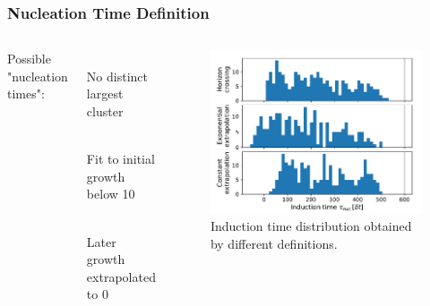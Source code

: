 \documentclass[smaller,notes=hide]{beamer}
\newlength{\wideitemsep}
\let\olditem\item
\renewcommand{\item}{\setlength{\itemsep}{\wideitemsep}\olditem}
\begin{document}
\begin{frame}
\frametitle{Nucleation Time Definition}
\begin{columns}
Possible "nucleation times": \vspace{0.25cm}\\

\begin{description}
\item[Horizon crossing:]{\hfill \\ \hspace{-1.5cm} No distinct largest cluster}

\item[Exponential extrapolation:]{\hfill \\ \hspace{-1.5cm} Fit to initial growth below 10}

\item[Constant extrapolation:]{\hfill \\ \hspace{-1.5cm} Later growth extrapolated to 0}
\end{description}


\begin{figure}[!h]
\centering
\includegraphics[width=1.0 \linewidth]{varying_induction_time.pdf}
\caption[Comparison of different definitions for the induction time]{Induction time distribution obtained by different definitions.}
\label{fig:induction_distributions}
\end{figure}

\end{columns}
\end{frame}
\end{document}
